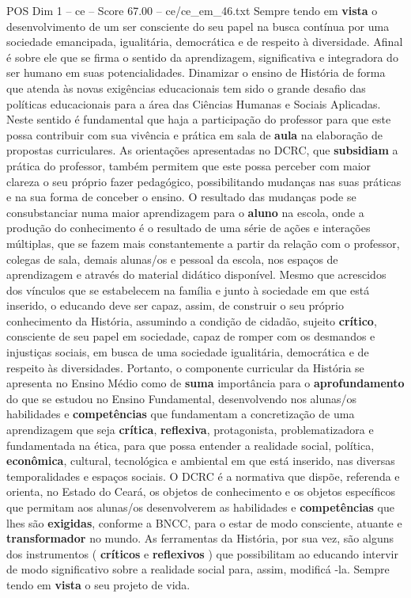 \begin{textsample}{POS Dim 1 – ce – Score 67.00 – ce/ce\_em\_46.txt}
Sempre tendo em \textbf{vista} o desenvolvimento de um ser consciente do seu papel na busca contínua por uma sociedade emancipada, igualitária, democrática e de respeito à diversidade.
Afinal é sobre ele que se firma o sentido da aprendizagem, significativa e integradora do ser humano em suas potencialidades.
Dinamizar o ensino de História de forma que atenda às novas exigências educacionais tem sido o grande desafio das políticas educacionais para a área das Ciências Humanas e Sociais Aplicadas.
Neste sentido é fundamental que haja a participação do professor para que este possa contribuir com sua vivência e prática em sala de \textbf{aula} na elaboração de propostas curriculares.
As orientações apresentadas no DCRC, que \textbf{subsidiam} a prática do professor, também permitem que este possa perceber com maior clareza o seu próprio fazer pedagógico, possibilitando mudanças nas suas práticas e na sua forma de conceber o ensino.
O resultado das mudanças pode se consubstanciar numa maior aprendizagem para o \textbf{aluno} na escola, onde a produção do conhecimento é o resultado de uma série de ações e interações múltiplas, que se fazem mais constantemente a partir da relação com o professor, colegas de sala, demais alunas/os e pessoal da escola, nos espaços de aprendizagem e através do material didático disponível.
Mesmo que acrescidos dos vínculos que se estabelecem na família e junto à sociedade em que está inserido, o educando deve ser capaz, assim, de construir o seu próprio conhecimento da História, assumindo a condição de cidadão, sujeito \textbf{crítico}, consciente de seu papel em sociedade, capaz de romper com os desmandos e injustiças sociais, em busca de uma sociedade igualitária, democrática e de respeito às diversidades.
Portanto, o componente curricular da História se apresenta no Ensino Médio como de \textbf{suma} importância para o \textbf{aprofundamento} do que se estudou no Ensino Fundamental, desenvolvendo nos alunas/os habilidades e \textbf{competências} que fundamentam a concretização de uma aprendizagem que seja \textbf{crítica}, \textbf{reflexiva}, protagonista, problematizadora e fundamentada na ética, para que possa entender a realidade social, política, \textbf{econômica}, cultural, tecnológica e ambiental em que está inserido, nas diversas temporalidades e espaços sociais.
O DCRC é a normativa que dispõe, referenda e orienta, no Estado do Ceará, os objetos de conhecimento e os objetos específicos que permitam aos alunas/os desenvolverem as habilidades e \textbf{competências} que lhes são \textbf{exigidas}, conforme a BNCC, para o estar de modo consciente, atuante e \textbf{transformador} no mundo.
As ferramentas da História, por sua vez, são alguns dos instrumentos ( \textbf{críticos} e \textbf{reflexivos} ) que possibilitam ao educando intervir de modo significativo sobre a realidade social para, assim, modificá -la.
Sempre tendo em \textbf{vista} o seu projeto de vida.


\end{textsample}
